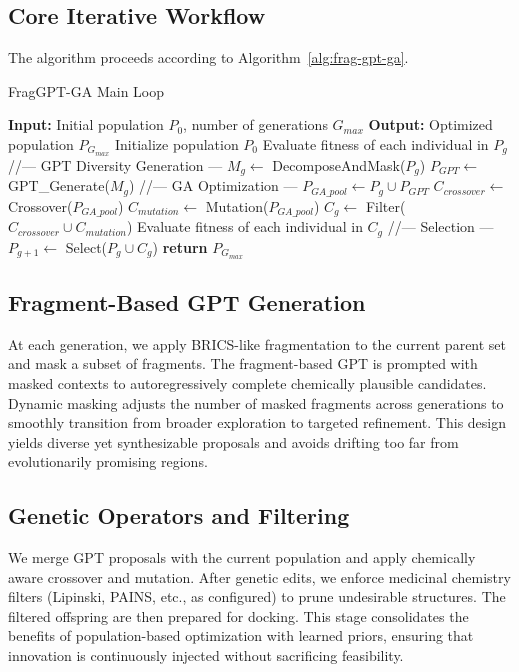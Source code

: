 \documentclass[lettersize,journal]{IEEEtran}
\begin{document}
\subsection{Core Iterative Workflow}
The algorithm proceeds according to Algorithm~\ref{alg:frag-gpt-ga}.
\begin{algorithm}[!t]
\caption{FragGPT-GA Main Loop}
\label{alg:frag-gpt-ga}
\begin{algorithmic}
\STATE \textbf{Input:} Initial population $P_0$, number of generations $G_{max}$
\STATE \textbf{Output:} Optimized population $P_{G_{max}}$
\STATE Initialize population $P_0$
    \STATE Evaluate fitness of each individual in $P_g$
    \STATE //--- GPT Diversity Generation ---
    \STATE $M_g \leftarrow$ DecomposeAndMask($P_g$)
    \STATE $P_{GPT} \leftarrow$ GPT\_Generate($M_g$)
    \STATE //--- GA Optimization ---
    \STATE $P_{GA\_pool} \leftarrow P_g \cup P_{GPT}$
    \STATE $C_{crossover} \leftarrow$ Crossover($P_{GA\_pool}$)
    \STATE $C_{mutation} \leftarrow$ Mutation($P_{GA\_pool}$)
    \STATE $C_g \leftarrow$ Filter($C_{crossover} \cup C_{mutation}$)
    \STATE Evaluate fitness of each individual in $C_g$
    \STATE //--- Selection ---
    \STATE $P_{g+1} \leftarrow$ Select($P_g \cup C_g$)
\ENDFOR
\STATE \textbf{return} $P_{G_{max}}$
\end{algorithmic}
\end{algorithm}

\subsection{Fragment-Based GPT Generation}
At each generation, we apply BRICS-like fragmentation to the current parent set and mask a subset of fragments. The fragment-based GPT is prompted with masked contexts to autoregressively complete chemically plausible candidates. Dynamic masking adjusts the number of masked fragments across generations to smoothly transition from broader exploration to targeted refinement. This design yields diverse yet synthesizable proposals and avoids drifting too far from evolutionarily promising regions.

\subsection{Genetic Operators and Filtering}
We merge GPT proposals with the current population and apply chemically aware crossover and mutation. After genetic edits, we enforce medicinal chemistry filters (Lipinski, PAINS, etc., as configured) to prune undesirable structures. The filtered offspring are then prepared for docking. This stage consolidates the benefits of population-based optimization with learned priors, ensuring that innovation is continuously injected without sacrificing feasibility.
\end{document}
